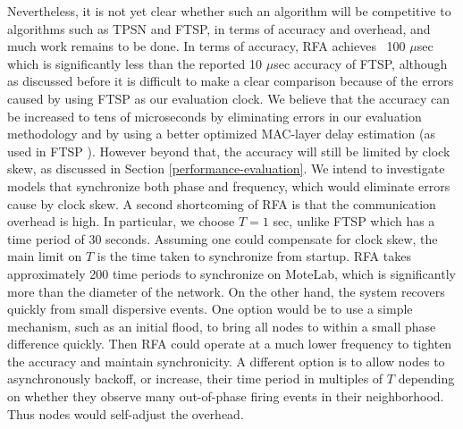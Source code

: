 Nevertheless, it is not yet clear whether such an algorithm will be
competitive to algorithms such as TPSN and FTSP, in terms of accuracy
and overhead, and much work remains to be done. In terms of accuracy,
RFA achieves ~100 $\mu$sec which is significantly less than the
reported 10 $\mu$sec accuracy of FTSP, although as discussed before it
is difficult to make a clear comparison because of the errors caused
by using FTSP as our evaluation clock. We believe that the accuracy
can be increased to tens of microseconds by eliminating errors in our
evaluation methodology and by using a better optimized MAC-layer delay
estimation (as used in FTSP \cite{ftsp}).  However beyond that, the
accuracy will still be limited by clock skew, as discussed in Section
\ref{performance-evaluation}. We intend to investigate models that
synchronize both phase and frequency, which would eliminate errors
cause by clock skew. A second shortcoming of RFA is that the
communication overhead is high. In particular, we choose $T=1$ sec,
unlike FTSP which has a time period of 30 seconds. Assuming one could
compensate for clock skew, the main limit on $T$ is the time taken to
synchronize from startup. RFA takes approximately 200 time periods to
synchronize on MoteLab, which is significantly more than the diameter
of the network. On the other hand, the system recovers quickly from
small dispersive events. One option would be to use a simple
mechanism, such as an initial flood, to bring all nodes to within a
small phase difference quickly. Then RFA could operate at a much lower
frequency to tighten the accuracy and maintain synchronicity. A
different option is to allow nodes to asynchronously backoff, or
increase, their time period in multiples of $T$ depending on whether
they observe many out-of-phase firing events in their
neighborhood. Thus nodes would self-adjust the overhead.





